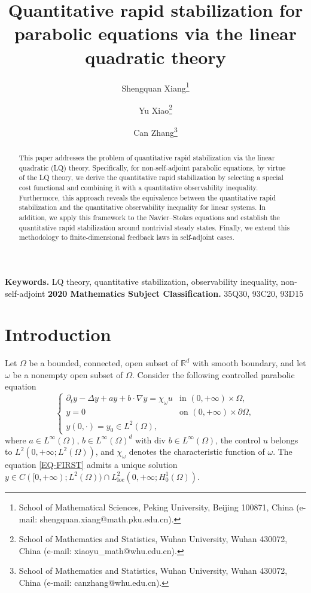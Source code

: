 \documentclass[a4paper]{article}
\title{Quantitative rapid stabilization for parabolic equations via the linear quadratic theory}
\author{Shengquan Xiang{\footnote{School of Mathematical Sciences, Peking University, Beijing 100871, China (e-mail: shengquan.xiang@math.pku.edu.cn).}}\and Yu Xiao{\footnote{School of Mathematics and Statistics, Wuhan University, Wuhan 430072, China (e-mail: xiaoyu\_math@whu.edu.cn).}}\and Can Zhang{\footnote{School of Mathematics and Statistics, Wuhan University, Wuhan 430072, China (e-mail: canzhang@whu.edu.cn).}}}
\date{}
\numberwithin{equation}{section}
\begin{document}
\maketitle
\begin{abstract}
This paper addresses the problem of quantitative rapid stabilization via the linear quadratic (LQ) theory. Specifically, for non-self-adjoint parabolic equations, by virtue of the LQ theory, we derive the quantitative rapid stabilization by selecting a special cost functional and combining it with a quantitative observability inequality. Furthermore, this approach reveals the equivalence between the quantitative rapid stabilization and the quantitative observability inequality for linear systems. In addition, we apply this framework to the Navier--Stokes equations and establish the quantitative rapid stabilization around nontrivial steady states. Finally, we extend this methodology to finite-dimensional feedback laws in self-adjoint cases.
\end{abstract}

{\bf Keywords.}  LQ theory, quantitative stabilization, observability inequality, non-self-adjoint
\vskip 6pt 
{\bf 2020 Mathematics Subject Classification.} 35Q30, 93C20, 93D15

\section{Introduction}
Let $\Omega$ be a bounded, connected, open subset of $\mathbb{R}^d$ with smooth boundary, and let $\omega$ be a nonempty open subset of $\Omega$.  Consider the following controlled parabolic equation
\begin{equation}\label{EQ-FIRST}
\begin{cases}
\partial_t y-\Delta y+ay+b\cdot\nabla y=\chi_{\omega}u&\text{in } (0,+\infty)\times\Omega,\\
y=0&\text{on } (0,+\infty)\times \partial\Omega,\\
y(0,\cdot)=y_0\in L^2(\Omega),
\end{cases}
\end{equation}
where $a \in L^\infty(\Omega)$, $b \in L^\infty(\Omega)^d$ with $\text{div } b\in L^\infty(\Omega)$, the control $u$ belongs to $L^2(0,+\infty;L^2(\Omega))$, and $\chi_\omega$ denotes the characteristic function of $\omega$. The equation \eqref{EQ-FIRST} admits a unique solution $y\in C([0,+\infty);L^2(\Omega))\cap L^2_{\text{loc}}(0,+\infty;H^1_0(\Omega))$.
\end{document}
